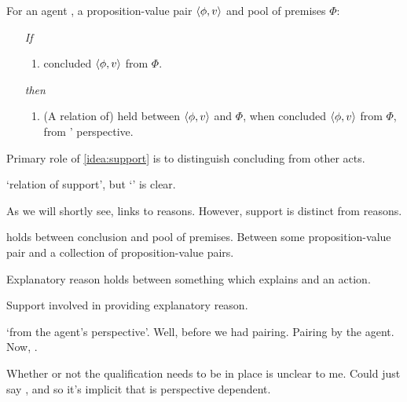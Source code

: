 \begin{note}
  \begin{idea}[Support I]
    \label{idea:support}
    For an agent \vAgent{}, a proposition-value pair \(\langle \phi, v \rangle\) and pool of premises \(\Phi\):

    \begin{itemize}
    \item[\emph{If}]
      \begin{enumerate}[label=\alph*., ref=(\alph*)]
      \item
        \vAgent{} concluded \(\langle \phi, v \rangle\) from \(\Phi\).
      \end{enumerate}
      \item[\emph{then}]
        \begin{enumerate}[label=\alph*., ref=(\alph*), resume]
        \item
          (A relation of) \emph{\support{}} held between \(\langle \phi, v \rangle\) and \(\Phi\), when \vAgent{} concluded \(\langle \phi, v \rangle\) from \(\Phi\), from \vAgent{}' perspective.
        \end{enumerate}
      \end{itemize}
      \vspace{-\baselineskip}
  \end{idea}

  Primary role of \autoref{idea:support} is to distinguish concluding from other acts.

  `relation of support', but `\support{}' is clear.
\end{note}

\begin{note}
  As we will shortly see, links to reasons.
  However, support is distinct from reasons.

   holds between conclusion and pool of premises.
  Between some proposition-value pair and a collection of proposition-value pairs.

  Explanatory reason holds between something which explains and an action.

  Support involved in providing explanatory reason.
\end{note}

\begin{note}
  `from the agent's perspective'.
  Well, before we had pairing.
  Pairing by the agent.
  Now, \support{}.

  Whether or not the qualification needs to be in place is unclear to me.
  Could just say \support{}, and so it's implicit that \support{} is perspective dependent.
\end{note}


